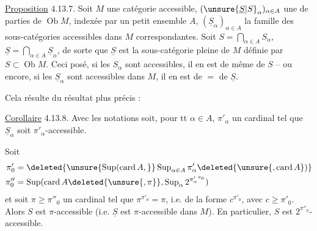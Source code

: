 
\uline{Proposition} 4.13.7. Soit $M$ une catégorie accessible,
$(\unsure{\underline S|S}_\alpha)_{\alpha\in A}$ une  de parties de $\operatorname{Ob}M$,
indexée par un petit ensemble $A$, $(\underline S_\alpha)_{\alpha\in A}$
la famille des sous-catégories accessibles dans $M$
correspondantes. Soit $S=\bigcap_{\alpha\in A}S_\alpha$, $\underline S=\bigcap_{\alpha\in A}\underline S_\alpha$, de
sorte que $\underline S$ est la sous-catégorie pleine de
$M$ définie par $S\subset\operatorname{Ob}M$. Ceci posé, si les
$S_\alpha$ sont accessibles, il en est de même
de $S$ -- ou encore, si les $\underline S_\alpha$ sont accessibles
dans $M$, il en est de $=$ de $\underline S$.

Cela résulte du résultat plus précis :

\uline{Corollaire} 4.13.8. Avec les notations 
soit, pour tt $\alpha\in A$, $\pi'_\alpha$ un cardinal  tel que
$\underline S_\alpha$ soit $\pi'_\alpha$-accessible.

 Soit
\[
\begin{aligned}
\pi'_0&=\deleted{\unsure{\operatorname{Sup}(\operatorname{card}A,}}\operatorname{Sup}_{\alpha\in A}\pi'_\alpha \deleted{\unsure{,\operatorname{card} A})}\\
\pi''_0&=\operatorname{Sup}(\operatorname{card}A\deleted{\unsure{,\pi}},\operatorname{Sup}_\alpha 2^{{\pi'_\alpha}^{\pi_0}})
\end{aligned}
\]
et soit $\pi\geq\pi''_0$ un cardinal tel que
$\pi^{\pi'_0}=\pi$, i.e. de la forme $c^{\pi'_0}$, avec $c\geq\pi'_0$.
Alors $S$ est $\pi$-accessible (i.e. $\underline S$ est $\pi$-accessible
dans $M$). En particulier, $S$ est $2^{\pi''_0}$-accessible.
